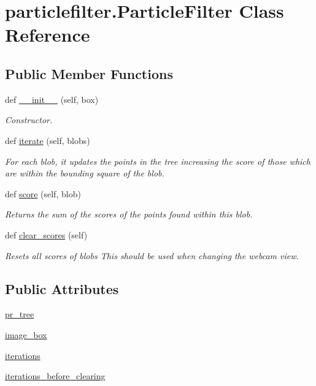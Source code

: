 \section{particlefilter.\+Particle\+Filter Class Reference}
\label{classparticlefilter_1_1ParticleFilter}
\subsection*{Public Member Functions}
\begin{DoxyCompactItemize}
\item 
def \hyperlink{classparticlefilter_1_1ParticleFilter_a6948f5fd9e23311a5d852d4cee9fcd74}{\+\_\+\+\_\+init\+\_\+\+\_\+} (self, box)
\begin{DoxyCompactList}\small\item\em Constructor. \end{DoxyCompactList}\item 
def \hyperlink{classparticlefilter_1_1ParticleFilter_a712cbf35d447e829bee6eb3511d6ed84}{iterate} (self, blobs)
\begin{DoxyCompactList}\small\item\em For each blob, it updates the points in the tree increasing the score of those which are within the bounding square of the blob. \end{DoxyCompactList}\item 
def \hyperlink{classparticlefilter_1_1ParticleFilter_a14d4400ba16d6413f279baa8d0aaff2d}{score} (self, blob)
\begin{DoxyCompactList}\small\item\em Returns the sum of the scores of the points found within this blob. \end{DoxyCompactList}\item 
def \hyperlink{classparticlefilter_1_1ParticleFilter_a23de668d643dfd03ef021b18129be7ec}{clear\+\_\+scores} (self)
\begin{DoxyCompactList}\small\item\em Resets all scores of blobs This should be used when changing the webcam view. \end{DoxyCompactList}\end{DoxyCompactItemize}
\subsection*{Public Attributes}
\begin{DoxyCompactItemize}
\item 
\hyperlink{classparticlefilter_1_1ParticleFilter_ad105183603f7e2a9b31ad9b51a904876}{pr\+\_\+tree}
\item 
\hyperlink{classparticlefilter_1_1ParticleFilter_a057adc68ef8ba14478db6e8a453eca32}{image\+\_\+box}
\item 
\hyperlink{classparticlefilter_1_1ParticleFilter_a6bb442d25bc95fd1174e0f1f65a5b059}{iterations}
\item 
\hyperlink{classparticlefilter_1_1ParticleFilter_a3aee419fa01abd6a08a0b512a79d5123}{iterations\+\_\+before\+\_\+clearing}
\end{DoxyCompactItemize}



